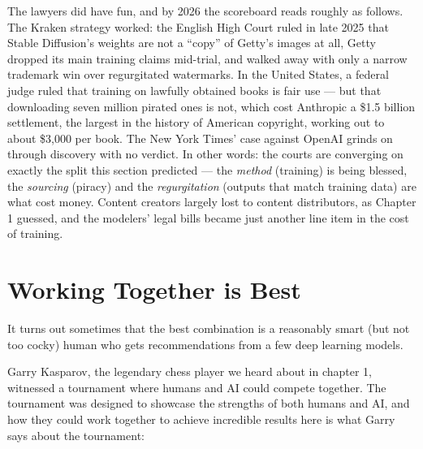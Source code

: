 The lawyers did have fun, and by 2026 the scoreboard reads roughly as follows. The Kraken strategy worked: the English High Court ruled in late 2025 that Stable Diffusion's weights are not a ``copy'' of Getty's images at all, Getty dropped its main training claims mid-trial, and walked away with only a narrow trademark win over regurgitated watermarks. In the United States, a federal judge ruled that training on lawfully obtained books is fair use --- but that downloading seven million pirated ones is not, which cost Anthropic a \$1.5 billion settlement, the largest in the history of American copyright, working out to about \$3,000 per book. The New York Times' case against OpenAI grinds on through discovery with no verdict. In other words: the courts are converging on exactly the split this section predicted --- the \textit{method} (training) is being blessed, the \textit{sourcing} (piracy) and the \textit{regurgitation} (outputs that match training data) are what cost money. Content creators largely lost to content distributors, as Chapter 1 guessed, and the modelers' legal bills became just another line item in the cost of training.

\section{Working Together is Best}

It turns out sometimes that the best combination is a reasonably smart (but not too cocky) human who gets recommendations from a few deep learning models. 

Garry Kasparov, the legendary chess player we heard about in chapter 1, witnessed a tournament where humans and AI could compete together. The tournament was designed to showcase the strengths of both humans and AI, and how they could work together to achieve incredible results here is what Garry says about the tournament:

